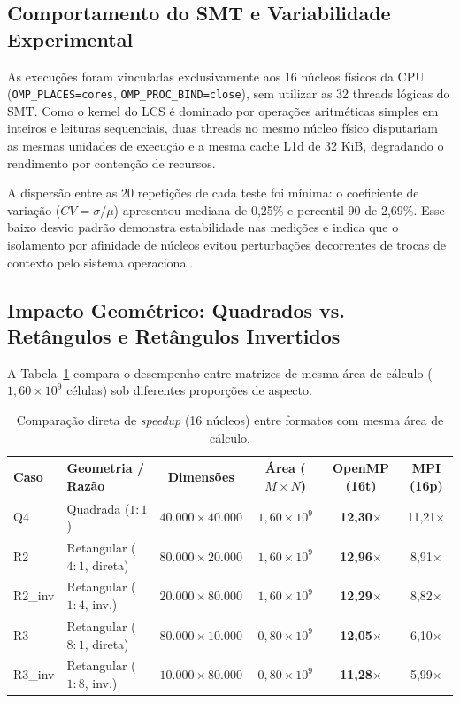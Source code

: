 \subsection{Comportamento do SMT e Variabilidade Experimental}

As execuções foram vinculadas exclusivamente aos 16 núcleos físicos da CPU (\texttt{OMP\_PLACES=cores}, \texttt{OMP\_PROC\_BIND=close}), sem utilizar as 32 threads lógicas do SMT. Como o kernel do LCS é dominado por operações aritméticas simples em inteiros e leituras sequenciais, duas threads no mesmo núcleo físico disputariam as mesmas unidades de execução e a mesma cache L1d de 32 KiB, degradando o rendimento por contenção de recursos.

A dispersão entre as 20 repetições de cada teste foi mínima: o coeficiente de variação ($CV = \sigma / \mu$) apresentou mediana de 0{,}25\% e percentil 90 de 2{,}69\%. Esse baixo desvio padrão demonstra estabilidade nas medições e indica que o isolamento por afinidade de núcleos evitou perturbações decorrentes de trocas de contexto pelo sistema operacional.

\subsection{Impacto Geométrico: Quadrados vs. Retângulos e Retângulos Invertidos}
\label{sec:impacto_geometria}

A Tabela~\ref{tab:comp_geometria} compara o desempenho entre matrizes de mesma área de cálculo ($1{,}60 \times 10^9$ células) sob diferentes proporções de aspecto.

\begin{table}[H]
\centering
\small
\caption{Comparação direta de \textit{speedup} (16 núcleos) entre formatos com mesma área de cálculo.}
\label{tab:comp_geometria}
\begin{tabular}{@{}llcccc@{}}
\toprule
\textbf{Caso} & \textbf{Geometria / Razão} & \textbf{Dimensões} & \textbf{Área ($M \times N$)} & \textbf{OpenMP (16t)} & \textbf{MPI (16p)} \\ \midrule
Q4      & Quadrada ($1:1$)          & $40.000 \times 40.000$ & $1{,}60 \times 10^9$ & \textbf{12{,}30$\times$} & 11{,}21$\times$ \\
R2      & Retangular ($4:1$, direta)& $80.000 \times 20.000$ & $1{,}60 \times 10^9$ & \textbf{12{,}96$\times$} & 8{,}91$\times$ \\
R2\_inv & Retangular ($1:4$, inv.)  & $20.000 \times 80.000$ & $1{,}60 \times 10^9$ & \textbf{12{,}29$\times$} & 8{,}82$\times$ \\ \midrule
R3      & Retangular ($8:1$, direta)& $80.000 \times 10.000$ & $0{,}80 \times 10^9$ & \textbf{12{,}05$\times$} & 6{,}10$\times$ \\
R3\_inv & Retangular ($1:8$, inv.)  & $10.000 \times 80.000$ & $0{,}80 \times 10^9$ & \textbf{11{,}28$\times$} & 5{,}99$\times$ \\ \bottomrule
\end{tabular}
\end{table}

